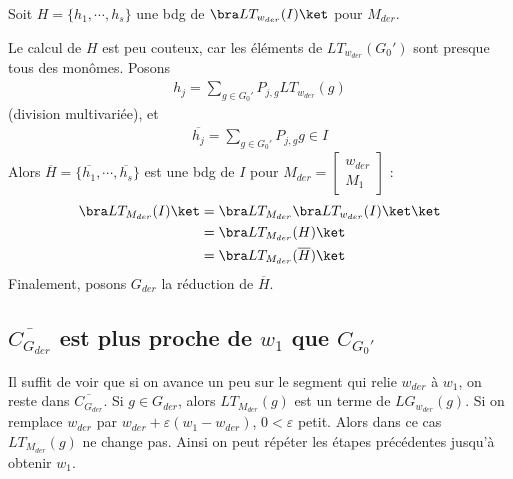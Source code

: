             Soit $H = \{h_1, \cdots, h_s\}$ une bdg de $\bra LT_{w_{der}}(I) \ket$ pour $M_{der}$.
            \begin{remq}
                Le calcul de $H$ est peu couteux, car les éléments de $LT_{w_{der}}(G_0')$ sont presque tous des monômes. Posons
                \begin{align*}
                    h_j = \sum_{g \in G_0'} P_{j,g}LT_{w_{der}}(g)
                \end{align*}
                (division multivariée), et
                \begin{align*}
                    \overline{h_j} = \sum_{g \in G_0'} P_{j,g}g \in I
                \end{align*}
                Alors $\overline{H} = \{\overline{h_1}, \cdots, \overline{h_s}\}$ est une bdg de $I$ pour $M_{der} = \begin{bmatrix} w_{der} \\ M_1 \end{bmatrix}$ :
                \begin{align*}
                    \bra LT_{M_{der}}(I) \ket &= \bra LT_{M_{der}} \bra LT_{w_{der}}(I) \ket \ket \\
                    &= \bra LT_{M_{der}}(H) \ket \\
                    &= \bra LT_{M_{der}}(\overline{H}) \ket \\
                \end{align*}
                Finalement, posons $G_{der}$ la réduction de $\overline{H}$.
            \end{remq}

        \subsection{$\overline{C_{G_{der}}}$ est plus proche de $w_1$ que $C_{G_0'}$}
            Il suffit de voir que si on avance un peu sur le segment qui relie $w_{der}$ à $w_1$, on reste dans $\overline{C_{G_{der}}}$. Si $g \in G_{der}$, alors $LT_{M_{der}}(g)$ est un terme de $LG_{w_{der}}(g)$. Si on remplace $w_{der}$ par $w_{der} + \varepsilon(w_1 - w_{der})$, $0 < \varepsilon$ petit. Alors dans ce cas $LT_{M_{der}}(g)$ ne change pas. Ainsi on peut répéter les étapes précédentes jusqu'à obtenir $w_1$.